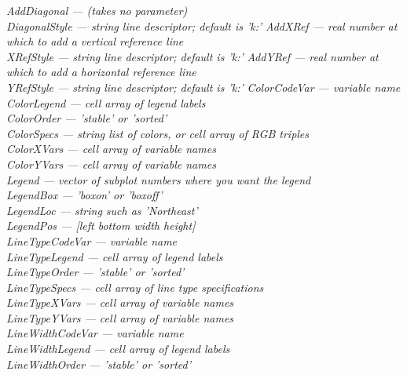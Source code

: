 \documentclass{article}
\newcommand{\namevalue}[2]{{\it #1 --- #2}}
\begin{document}
\namevalue{AddDiagonal}{(takes no parameter)} \\  %
\hspace*{1cm} \namevalue{DiagonalStyle}{string line descriptor; default is 'k:'}
\namevalue{AddXRef}{real number at which to add a vertical reference line} \\
\hspace*{1cm} \namevalue{XRefStyle}{string line descriptor; default is 'k:'}
\namevalue{AddYRef}{real number at which to add a horizontal reference line} \\
\hspace*{1cm} \namevalue{YRefStyle}{string line descriptor; default is 'k:'}
\namevalue{ColorCodeVar}{variable name} \\
\namevalue{ColorLegend}{cell array of legend labels} \\
\namevalue{ColorOrder}{'stable' or 'sorted'} \\
\namevalue{ColorSpecs}{string list of colors, or cell array of RGB triples} \\
\namevalue{ColorXVars}{cell array of variable names} \\
\namevalue{ColorYVars}{cell array of variable names} \\
\namevalue{Legend}{vector of subplot numbers where you want the legend} \\
\namevalue{LegendBox}{'boxon' or 'boxoff'} \\
\namevalue{LegendLoc}{string such as 'Northeast'} \\
\namevalue{LegendPos}{[left bottom width height]} \\
\namevalue{LineTypeCodeVar}{variable name} \\
\namevalue{LineTypeLegend}{cell array of legend labels} \\
\namevalue{LineTypeOrder}{'stable' or 'sorted'} \\
\namevalue{LineTypeSpecs}{cell array of line type specifications} \\
\namevalue{LineTypeXVars}{cell array of variable names} \\
\namevalue{LineTypeYVars}{cell array of variable names} \\
\namevalue{LineWidthCodeVar}{variable name} \\
\namevalue{LineWidthLegend}{cell array of legend labels} \\
\namevalue{LineWidthOrder}{'stable' or 'sorted'} \\
\end{document}
